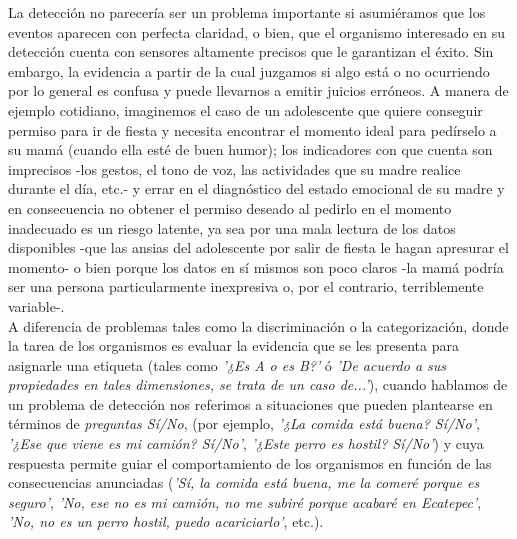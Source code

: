 La detección no parecería ser un problema importante si asumiéramos que los eventos aparecen con perfecta claridad, o bien, que el organismo interesado en su detección cuenta con sensores altamente precisos que le garantizan el éxito. Sin embargo, la evidencia a partir de la cual juzgamos si algo está o no ocurriendo por lo general es confusa y puede llevarnos a emitir juicios erróneos. A manera de ejemplo cotidiano, imaginemos el caso de un adolescente que quiere conseguir permiso para ir de fiesta y necesita encontrar el momento ideal para pedírselo a su mamá (cuando ella esté de buen humor); los indicadores con que cuenta son imprecisos -los gestos, el tono de voz, las actividades que su madre realice durante el día, etc.- y errar en el diagnóstico del estado emocional de su madre y en consecuencia no obtener el permiso deseado al pedirlo en el momento inadecuado es un riesgo latente, ya sea por una mala lectura de los datos disponibles -que las ansias del adolescente por salir de fiesta le hagan apresurar el momento- o bien porque los datos en sí mismos son poco claros -la mamá podría ser una persona particularmente inexpresiva o, por el contrario, terriblemente variable-.\\ 

A diferencia de problemas tales como la discriminación o la categorización, donde la tarea de los organismos es evaluar la evidencia que se les presenta para asignarle una etiqueta (tales como \textit{'¿Es A o es B?'} ó \textit{'De acuerdo a sus propiedades en tales dimensiones, se trata de un caso de...'}), cuando hablamos de un problema de detección nos referimos a situaciones que pueden plantearse en términos de \textit{preguntas Sí/No}, (por ejemplo, \textit{'¿La comida está buena? Sí/No'}, \textit{'¿Ese que viene es mi camión? Sí/No'}, \textit{'¿Este perro es hostil? Sí/No'}) y cuya respuesta permite guiar el comportamiento de los organismos en función de las consecuencias anunciadas (\textit{'Sí, la comida está buena, me la comeré porque es seguro'}, \textit{'No, ese no es mi camión, no me subiré porque acabaré en Ecatepec'}, \textit{'No, no es un perro hostil, puedo acariciarlo'}, etc.).\\ 

